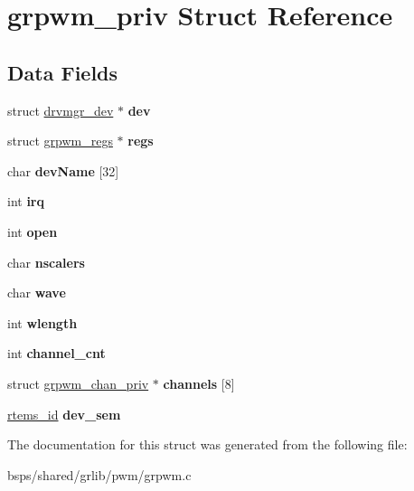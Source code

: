 \hypertarget{structgrpwm__priv}{}\section{grpwm\+\_\+priv Struct Reference}
\label{structgrpwm__priv}
\subsection*{Data Fields}
\begin{DoxyCompactItemize}
\item 
\mbox{\label{structgrpwm__priv_a5d7a688e229615fcc60100f3b64f12cb}} 
struct \mbox{\hyperlink{structdrvmgr__dev}{drvmgr\+\_\+dev}} $\ast$ {\bfseries dev}
\item 
\mbox{\label{structgrpwm__priv_a576904b74ca15c46952ea79af3631fab}} 
struct \mbox{\hyperlink{structgrpwm__regs}{grpwm\+\_\+regs}} $\ast$ {\bfseries regs}
\item 
\mbox{\label{structgrpwm__priv_a11af66050105053d9f075b1ca20cf0e0}} 
char {\bfseries dev\+Name} \mbox{[}32\mbox{]}
\item 
\mbox{\label{structgrpwm__priv_a84321c64234925c7e27935f3d6774cf3}} 
int {\bfseries irq}
\item 
\mbox{\label{structgrpwm__priv_a33433f19bb70c9b925bfdd033a52b3b9}} 
int {\bfseries open}
\item 
\mbox{\label{structgrpwm__priv_a313923cb7620bd13711091d5c95898bc}} 
char {\bfseries nscalers}
\item 
\mbox{\label{structgrpwm__priv_ab7dcfccf2081f3f7a2a9e9582c7f6739}} 
char {\bfseries wave}
\item 
\mbox{\label{structgrpwm__priv_a02e07327f77bb8e05a2c0f6e55e9ea59}} 
int {\bfseries wlength}
\item 
\mbox{\label{structgrpwm__priv_aebec2e6bdb4855903fa3f68f3b4dc295}} 
int {\bfseries channel\+\_\+cnt}
\item 
\mbox{\label{structgrpwm__priv_a9cfaa2c23204bda20512856c3fb6cfb4}} 
struct \mbox{\hyperlink{structgrpwm__chan__priv}{grpwm\+\_\+chan\+\_\+priv}} $\ast$ {\bfseries channels} \mbox{[}8\mbox{]}
\item 
\mbox{\label{structgrpwm__priv_a06f7f00182314c4c0c3db945e7b64f45}} 
\mbox{\hyperlink{group__ClassicTasks_gab20892b814dced7dd4e5b9bf42becd57}{rtems\+\_\+id}} {\bfseries dev\+\_\+sem}
\end{DoxyCompactItemize}


The documentation for this struct was generated from the following file\+:\begin{DoxyCompactItemize}
\item 
bsps/shared/grlib/pwm/grpwm.\+c\end{DoxyCompactItemize}
